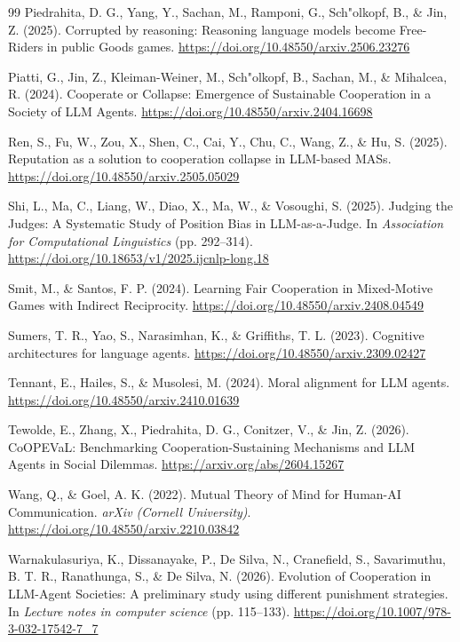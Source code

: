\documentclass[12pt,letterpaper]{article}
\begin{document}
\begin{thebibliography}{99}
Piedrahita, D. G., Yang, Y., Sachan, M., Ramponi, G., Sch"olkopf, B., \& Jin, Z. (2025). Corrupted by reasoning: Reasoning language models become Free-Riders in public Goods games. \url{https://doi.org/10.48550/arxiv.2506.23276}

Piatti, G., Jin, Z., Kleiman-Weiner, M., Sch"olkopf, B., Sachan, M., \& Mihalcea, R. (2024). Cooperate or Collapse: Emergence of Sustainable Cooperation in a Society of LLM Agents. \url{https://doi.org/10.48550/arxiv.2404.16698}

Ren, S., Fu, W., Zou, X., Shen, C., Cai, Y., Chu, C., Wang, Z., \& Hu, S. (2025). Reputation as a solution to cooperation collapse in LLM-based MASs. \url{https://doi.org/10.48550/arxiv.2505.05029}

Shi, L., Ma, C., Liang, W., Diao, X., Ma, W., \& Vosoughi, S. (2025). Judging the Judges: A Systematic Study of Position Bias in LLM-as-a-Judge. In \textit{Association for Computational Linguistics} (pp. 292--314). \url{https://doi.org/10.18653/v1/2025.ijcnlp-long.18}

Smit, M., \& Santos, F. P. (2024). Learning Fair Cooperation in Mixed-Motive Games with Indirect Reciprocity. \url{https://doi.org/10.48550/arxiv.2408.04549}

Sumers, T. R., Yao, S., Narasimhan, K., \& Griffiths, T. L. (2023). Cognitive architectures for language agents. \url{https://doi.org/10.48550/arxiv.2309.02427}

Tennant, E., Hailes, S., \& Musolesi, M. (2024). Moral alignment for LLM agents. \url{https://doi.org/10.48550/arxiv.2410.01639}

Tewolde, E., Zhang, X., Piedrahita, D. G., Conitzer, V., \& Jin, Z. (2026). CoOPEVaL: Benchmarking Cooperation-Sustaining Mechanisms and LLM Agents in Social Dilemmas. \url{https://arxiv.org/abs/2604.15267}

Wang, Q., \& Goel, A. K. (2022). Mutual Theory of Mind for Human-AI Communication. \textit{arXiv (Cornell University)}. \url{https://doi.org/10.48550/arxiv.2210.03842}

Warnakulasuriya, K., Dissanayake, P., De Silva, N., Cranefield, S., Savarimuthu, B. T. R., Ranathunga, S., \& De Silva, N. (2026). Evolution of Cooperation in LLM-Agent Societies: A preliminary study using different punishment strategies. In \textit{Lecture notes in computer science} (pp. 115--133). \url{https://doi.org/10.1007/978-3-032-17542-7_7}


\end{thebibliography}
\end{document}
